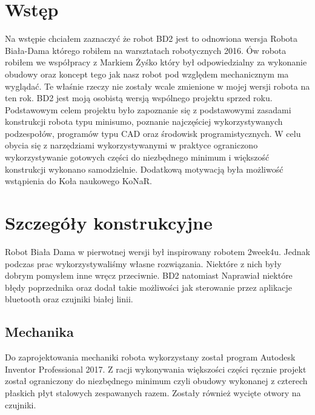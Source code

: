\documentclass[12pt,a4paper]{article}
\begin{document}
\maketitle %
\tableofcontents %
\newpage %

\section{Wstęp}
Na wstępie chciałem zaznaczyć że robot BD2 jest to odnowiona wersja Robota Biała-Dama którego robiłem na warsztatach robotycznych 2016. Ów robota robiłem we współpracy z Markiem Żyśko który był odpowiedzialny za wykonanie obudowy oraz koncept tego jak nasz robot pod względem mechanicznym ma wyglądać. Te właśnie rzeczy nie zostały wcale zmienione w mojej wersji robota na ten rok. BD2 jest moją osobistą wersją wspólnego projektu sprzed roku. Podstawowym celem projektu było zapoznanie się z podstawowymi zasadami konstrukcji
robota typu minisumo, poznanie najczęściej wykorzystywanych podzespołów,
programów typu CAD oraz środowisk programistycznych. W celu
obycia się z narzędziami wykorzystywanymi w praktyce ograniczono wykorzystywanie
gotowych części do niezbędnego minimum i większość konstrukcji
wykonano samodzielnie. Dodatkową motywacją była możliwość wstąpienia
do Koła naukowego KoNaR.


\section{Szczegóły konstrukcyjne}

Robot Biała Dama w pierwotnej wersji był inspirowany robotem 2week4u.
Jednak podczas prac wykorzystywaliśmy własne rozwiązania. Niektóre z nich
były dobrym pomysłem inne wręcz przeciwnie. BD2 natomiast Naprawiał niektóre błędy poprzednika oraz dodał takie możliwości jak sterowanie przez aplikacje bluetooth oraz czujniki białej linii.

\subsection{Mechanika}
Do zaprojektowania mechaniki robota wykorzystany został program Autodesk
Inventor Professional 2017. Z racji wykonywania większości części ręcznie
projekt został ograniczony do niezbędnego minimum czyli obudowy wykonanej
z czterech płaskich płyt stalowych zespawanych razem. Zostały również wycięte otwory na czujniki.
\end{document}
